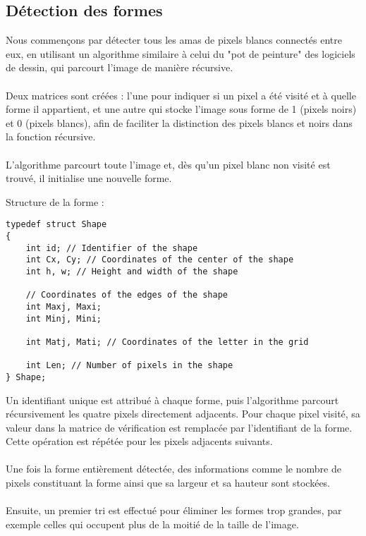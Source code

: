 \documentclass{article}
\begin{document}
\newpage
\subsection{Détection des formes}

Nous commençons par détecter tous les amas de pixels blancs connectés entre eux, en utilisant un algorithme similaire à celui du "pot de peinture" des logiciels de dessin, qui parcourt l'image de manière récursive.
\\\\
Deux matrices sont créées : l'une pour indiquer si un pixel a été visité et à quelle forme il appartient, et une autre qui stocke l'image sous forme de 1 (pixels noirs) et 0 (pixels blancs), afin de faciliter la distinction des pixels blancs et noirs dans la fonction récursive.
\\\\
L'algorithme parcourt toute l'image et, dès qu'un pixel blanc non visité est trouvé, il initialise une nouvelle forme.

\noindent Structure de la forme :
\begin{lstlisting}
typedef struct Shape 
{
    int id; // Identifier of the shape
    int Cx, Cy; // Coordinates of the center of the shape
    int h, w; // Height and width of the shape

    // Coordinates of the edges of the shape
    int Maxj, Maxi;
    int Minj, Mini;

    int Matj, Mati; // Coordinates of the letter in the grid

    int Len; // Number of pixels in the shape
} Shape;

\end{lstlisting}

\vspace{0.5cm}
\newpage
Un identifiant unique est attribué à chaque forme, puis l'algorithme parcourt récursivement les quatre pixels directement adjacents. Pour chaque pixel visité, sa valeur dans la matrice de vérification est remplacée par l’identifiant de la forme. Cette opération est répétée pour les pixels adjacents suivants.
\\\\
Une fois la forme entièrement détectée, des informations comme le nombre de pixels constituant la forme ainsi que sa largeur et sa hauteur sont stockées.
\\\\
Ensuite, un premier tri est effectué pour éliminer les formes trop grandes, par exemple celles qui occupent plus de la moitié de la taille de l'image.
\end{document}
